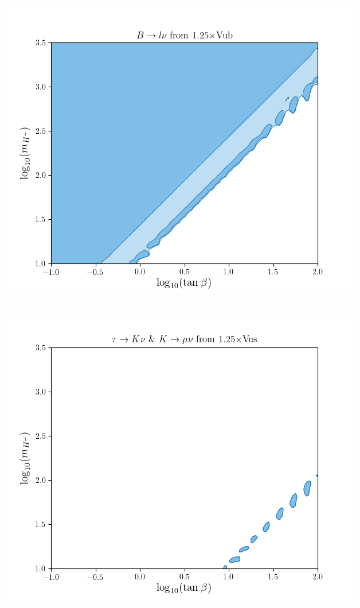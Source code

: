 \documentclass[11pt]{article}
\begin{document}
\begin{figure}[H]
\begin{subfigure}[b]{0.45\textwidth}
        \includegraphics[width=\textwidth]{vub/Blnu1.25.png}
    \end{subfigure}
    \begin{subfigure}[b]{0.45\textwidth}
        \includegraphics[width=\textwidth]{vus/Klnu1.25.png}
    \end{subfigure}
    \begin{subfigure}[b]{0.45\textwidth}

\end{subfigure}
\end{figure}
\end{document}
